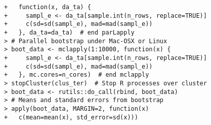 \documentclass[10pt]{beamer}\usepackage[]{graphicx}\usepackage[]{color}
\makeatletter
\newenvironment{kframe}{%
 \def\at@end@of@kframe{}%
 \ifinner\ifhmode%
  \def\at@end@of@kframe{\end{minipage}}%
  \begin{minipage}{\columnwidth}%
 \fi\fi%
 \def\FrameCommand##1{\hskip\@totalleftmargin \hskip-\fboxsep
 \colorbox{shadecolor}{##1}\hskip-\fboxsep
     \hskip-\linewidth \hskip-\@totalleftmargin \hskip\columnwidth}%
 \MakeFramed {\advance\hsize-\width
   \@totalleftmargin\z@ \linewidth\hsize
   \@setminipage}}%
 {\par\unskip\endMakeFramed%
 \at@end@of@kframe}
\newenvironment{knitrout}{}{} %
\makeatother
\begin{document}
\begin{frame}[fragile,t]{\subsecname}
\begin{block}{}
\begin{columns}[T]
\begin{knitrout}
\begin{kframe}
\begin{verbatim}
+   function(x, da_ta) {
+     sampl_e <- da_ta[sample.int(n_rows, replace=TRUE)]
+     c(sd=sd(sampl_e), mad=mad(sampl_e))
+   }, da_ta=da_ta)  # end parLapply
> # Parallel bootstrap under Mac-OSX or Linux
> boot_data <- mclapply(1:10000, function(x) {
+     sampl_e <- da_ta[sample.int(n_rows, replace=TRUE)]
+     c(sd=sd(sampl_e), mad=mad(sampl_e))
+   }, mc.cores=n_cores)  # end mclapply
> stopCluster(clus_ter)  # Stop R processes over cluster
> boot_data <- rutils::do_call(rbind, boot_data)
> # Means and standard errors from bootstrap
> apply(boot_data, MARGIN=2, function(x)
+   c(mean=mean(x), std_error=sd(x)))
\end{verbatim}
\end{kframe}
\end{knitrout}
  \end{columns}
\end{block}

\end{frame}


\end{document}

